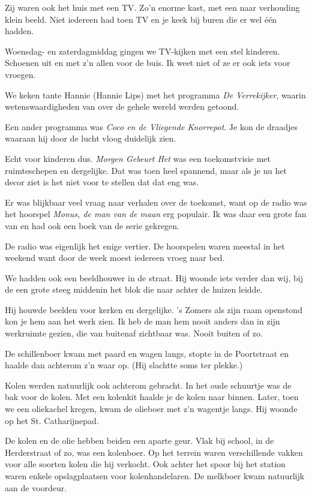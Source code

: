 \documentclass[10pt,twoside, openright]{memoir}
\begin{document}
Zij waren ook het huis met een TV. Zo’n enorme kast, met een naar verhouding klein beeld. Niet iedereen had toen TV en je keek bij buren die er wel één hadden.

Woensdag- en zaterdagmiddag gingen we TV-kijken met een stel kinderen. Schoenen uit en met z'n allen voor de buis. Ik weet niet of ze er ook iets voor vroegen.

We keken tante Hannie (Hannie Lips) met het programma \emph{De Verrekijker}, waarin wetenswaardigheden van over de gehele wereld werden getoond. 

Een ander programma was \emph{Coco en de Vliegende Knorrepot}. Je kon de draadjes waaraan hij door de lucht vloog duidelijk zien. 

Echt voor kinderen dus. \emph{Morgen Gebeurt Het} was een toekomstvisie met ruimteschepen en dergelijke. Dat was toen heel spannend, maar als je nu het decor ziet is het niet voor te stellen dat dat eng was.

Er was blijkbaar veel vraag naar verhalen over de toekomst, want op de radio was het hoorspel \emph{Monus, de man van de maan} erg populair. Ik was daar een grote fan van en had ook een boek van de serie gekregen.

De radio was eigenlijk het enige vertier. De hoorspelen waren meestal in het weekend want door de week moest iedereen vroeg naar bed.

We hadden ook een beeldhouwer in de straat. Hij woonde iets verder dan wij, bij de een grote steeg middenin het blok die naar achter de huizen leidde.  

Hij houwde beelden voor kerken en dergelijke. 's Zomers als zijn raam openstond kon je hem aan het werk zien. Ik heb de man hem nooit anders dan in zijn werkruimte gezien, die van buitenaf zichtbaar was. Nooit buiten of zo.

De schillenboer kwam met paard en wagen langs, stopte in de Poortstraat en haalde dan achterom z’n waar op. (Hij slachtte soms ter plekke.) 


Kolen werden natuurlijk ook achterom gebracht. In het oude schuurtje was de bak voor de kolen. Met een kolenkit haalde je de kolen naar binnen. Later, toen we een oliekachel kregen, kwam de olieboer met z’n wagentje langs. Hij woonde op het St. Catharijnepad.

De kolen en de olie hebben beiden een aparte geur. Vlak bij school, in de Herderstraat of zo, was een kolenboer. Op het terrein waren verschillende vakken voor alle soorten kolen die hij verkocht. Ook achter het spoor bij het station waren enkele opslagplaatsen voor kolenhandelaren. De melkboer kwam natuurlijk aan de voordeur.
\end{document}
